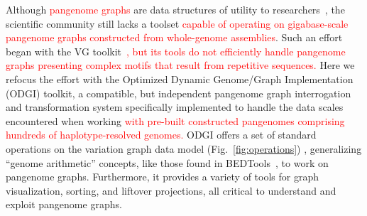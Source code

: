 \documentclass{bioinfo}
\newcommand{\REVIEWED}[1]{{\textcolor{Red}{#1}}}
\begin{document}
Although \REVIEWED{pangenome graphs} are data structures of utility to researchers~\citep{cpang2018,Garrison:2018,Baaijens_2019,Hickey:2020,Sibbesen_2021}, the scientific community still lacks a toolset \REVIEWED{capable of operating on gigabase-scale pangenome graphs constructed from whole-genome assemblies}.
Such an effort began with the VG toolkit~\citep{Garrison:2018}\REVIEWED{, but its tools do not efficiently handle pangenome graphs presenting complex motifs that result from repetitive sequences.}
Here we refocus the effort with the Optimized Dynamic Genome/Graph Implementation (ODGI) toolkit, a compatible, but independent pangenome graph interrogation and transformation system specifically implemented to handle the data scales encountered when working \REVIEWED{with pre-built constructed pangenomes comprising hundreds of haplotype-resolved genomes.}
ODGI offers a set of standard operations on the variation graph data model (Fig.~\ref{fig:operations}) , generalizing ``genome arithmetic'' concepts, like those found in BEDTools~\citep{Quinlan_2010}, to work on pangenome graphs.
Furthermore, it provides a variety of tools for graph visualization, sorting, and liftover projections, all critical to understand and exploit pangenome graphs.


\end{document}
